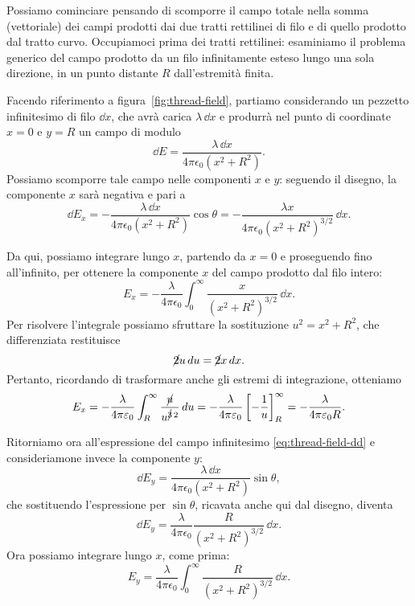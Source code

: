 \documentclass[10pt]{gulartcl}
\begin{document}
\begin{solution}
Possiamo cominciare pensando di scomporre il campo totale nella somma
(vettoriale) dei campi prodotti dai due tratti rettilinei di filo e di
quello prodotto dal tratto curvo. Occupiamoci prima dei tratti rettilinei:
esaminiamo il problema generico del campo prodotto da un filo infinitamente
esteso lungo una sola direzione, in un punto distante $R$ dall’estremità
finita.

Facendo riferimento a figura~\ref{fig:thread-field}, partiamo considerando
un pezzetto infinitesimo di filo $\dd x$, che avrà carica $\lambda\,\dd x$
e produrrà nel punto di coordinate $x = 0$ e $y = R$ un campo di modulo
\begin{equation}
    \dd E = \frac{\lambda\, \dd x}{4 \pi \epsilon_0 (x^2 + R^2)}.
    \label{eq:thread-field-dd}
\end{equation}
Possiamo scomporre tale campo nelle componenti $x$ e $y$: seguendo il
disegno, la componente $x$ sarà negativa e pari a
\begin{equation}
    \dd E_x = - \frac{\lambda\, \dd x}{4 \pi \epsilon_0 (x^2 + R^2)}
    \cos\theta = - \frac{\lambda x}{4 \pi \epsilon_0 (x^{2} +
    R^{2})^{3/2}} \, \dd x.
\end{equation}

Da qui, possiamo integrare lungo $x$, partendo da $x = 0$ e proseguendo
fino all’infinito, per ottenere la componente $x$ del campo prodotto dal
filo intero:
\begin{equation}
    E_x = -\frac{\lambda}{4 \pi \epsilon_0} \int_{0}^{\infty}
    \frac{x}{(x^{2} + R^{2})^{3/2}}\, \dd x.
\end{equation}
Per risolvere l’integrale possiamo sfruttare la sostituzione $u^2 = x^2 +
R^2$, che differenziata restituisce
\begin{equation}
    \cancel{2}u \, d u = \cancel{2}x \, d x.
\end{equation}
Pertanto, ricordando di trasformare anche gli estremi di integrazione,
otteniamo
\begin{equation}
    E_x = - \frac{\lambda}{4 \pi \varepsilon_0} \int_{R}^{\infty}
    \frac{\cancel{u}}{u^{\cancel{3}\, 2}} \, d u = - \frac{\lambda}{4 \pi
    \varepsilon_0} \left[-\frac{1}{u}\right]_{R}^{\infty} = -
    \frac{\lambda}{4\pi\varepsilon_0 R}.
\end{equation}

Ritorniamo ora all’espressione del campo infinitesimo
\eqref{eq:thread-field-dd} e consideriamone invece la componente $y$:
\begin{equation}
    \dd E_y = \frac{\lambda\, \dd x}{4\pi\epsilon_0 (x^{2} + R^{2})}
    \sin\theta,
\end{equation}
che sostituendo l’espressione per $\sin\theta$, ricavata anche qui dal
disegno, diventa
\begin{equation}
    \dd E_y = \frac{\lambda}{4\pi\epsilon_0} \frac{R}{(x^{2} +
    R^{2})^{3/2}}\, \dd x.
\end{equation}
Ora possiamo integrare lungo $x$, come prima:
\begin{equation}
    E_y = \frac{\lambda}{4\pi\epsilon_0} \int_{0}^{\infty} \frac{R}{(x^{2}
    + R^{2})^{3/2}} \, \dd x.
\end{equation}


\end{solution}
\end{document}
